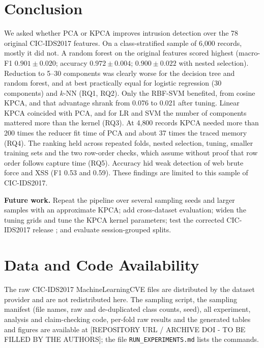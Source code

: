 \documentclass[runningheads]{llncs}
\begin{document}
\section{Conclusion}
We asked whether PCA or KPCA improves intrusion detection over the 78 original CIC-IDS2017 features. On a class-stratified sample of 6{,}000 records, mostly it did not. A random forest on the original features scored highest (macro-F1 $0.901\pm0.020$; accuracy $0.972\pm0.004$; $0.900\pm0.022$ with nested selection). Reduction to 5--30 components was clearly worse for the decision tree and random forest, and at best practically equal for logistic regression (30 components) and $k$-NN (RQ1, RQ2). Only the RBF-SVM benefited, from cosine KPCA, and that advantage shrank from 0.076 to 0.021 after tuning. Linear KPCA coincided with PCA, and for LR and SVM the number of components mattered more than the kernel (RQ3). At 4{,}800 records KPCA needed more than 200 times the reducer fit time of PCA and about 37 times the traced memory (RQ4). The ranking held across repeated folds, nested selection, tuning, smaller training sets and the two row-order checks, which assume without proof that row order follows capture time (RQ5). Accuracy hid weak detection of web brute force and XSS (F1 0.53 and 0.59). These findings are limited to this sample of CIC-IDS2017.

\textbf{Future work.} Repeat the pipeline over several sampling seeds and larger samples with an approximate KPCA; add cross-dataset evaluation; widen the tuning grids and tune the KPCA kernel parameters; test the corrected CIC-IDS2017 release \cite{engelen2021}; and evaluate session-grouped splits.


\section*{Data and Code Availability}
The raw CIC-IDS2017 MachineLearningCVE files are distributed by the dataset provider \cite{sharafaldin2018} and are not redistributed here. The sampling script, the sampling manifest (file names, raw and de-duplicated class counts, seed), all experiment, analysis and claim-checking code, per-fold raw results and the generated tables and figures are available at [REPOSITORY URL / ARCHIVE DOI - TO BE FILLED BY THE AUTHORS]; the file \texttt{RUN\_EXPERIMENTS.md} lists the commands.
\end{document}
